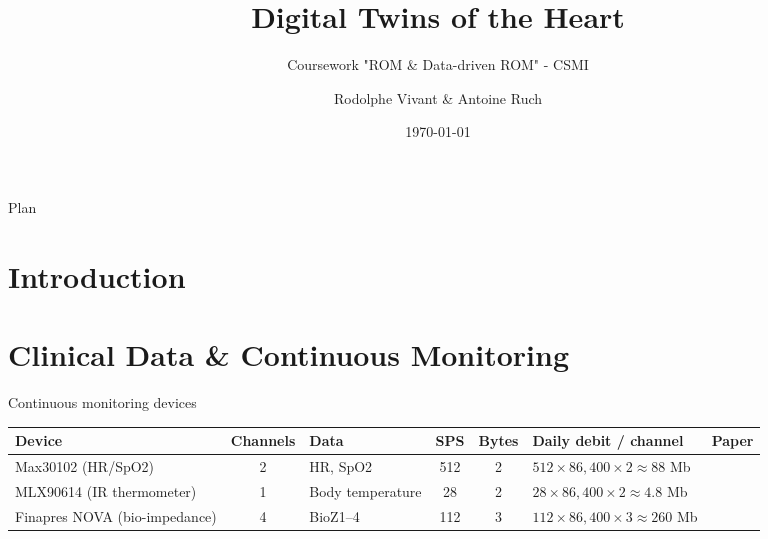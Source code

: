 \documentclass{beamer}
\title{Digital Twins of the Heart}
\subtitle{Coursework "ROM \& Data-driven ROM" - CSMI}
\author{Rodolphe Vivant \& Antoine Ruch}
\institute{UFR of Mathematics and Informatics}
\date{\today}
\begin{document}
\begin{frame}
  \titlepage
\end{frame}

\begin{frame}{Plan}
  \tableofcontents
\end{frame}

\section{Introduction}


\section{Clinical Data \& Continuous Monitoring}
\begin{frame}{Continuous monitoring devices}

  \scriptsize
  \begin{tabularx}{\textwidth}{|Y|c|Y|c|c|Y|c|}
  \hline
  \textbf{Device} & \textbf{Channels} & \textbf{Data} & \textbf{SPS} & \textbf{Bytes} & \textbf{Daily debit / channel} & \textbf{Paper} \\
  \hline
  Max30102 (HR/SpO2) 
  & 2 
  & HR, SpO2 
  & 512 
  & 2 
  & $512 \times 86{,}400 \times 2 \approx 88$ Mb 
  & \cite{jameil2025digital} \\
  \hline
  MLX90614 (IR thermometer) 
  & 1 
  & Body temperature 
  & 28 
  & 2 
  & $28 \times 86{,}400 \times 2 \approx 4.8$ Mb 
  & \cite{jameil2025digital} \\
  \hline
  Finapres NOVA (bio-impedance) 
  & 4 
  & BioZ1--4 
  & 112 
  & 3 
  & $112 \times 86{,}400 \times 3 \approx 260$ Mb 
  & \cite{jafari2022} \\
  \hline
  \end{tabularx}
  
\end{frame}
\end{document}
